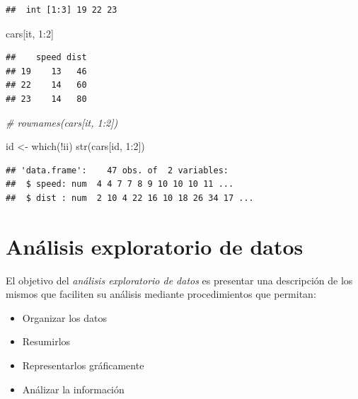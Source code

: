 \documentclass[
]{book}
\newenvironment{Shaded}{\begin{snugshade}}{\end{snugshade}}
\newcommand{\CommentTok}[1]{\textcolor[rgb]{0.56,0.35,0.01}{\textit{#1}}}
\newcommand{\DecValTok}[1]{\textcolor[rgb]{0.00,0.00,0.81}{#1}}
\newcommand{\FunctionTok}[1]{\textcolor[rgb]{0.00,0.00,0.00}{#1}}
\newcommand{\NormalTok}[1]{#1}
\newcommand{\OtherTok}[1]{\textcolor[rgb]{0.56,0.35,0.01}{#1}}
\newcommand{\SpecialCharTok}[1]{\textcolor[rgb]{0.00,0.00,0.00}{#1}}
\providecommand{\tightlist}{%
  \setlength{\itemsep}{0pt}\setlength{\parskip}{0pt}}
\theoremstyle{break}
\theoremstyle{nonumberplain}
\begin{document}
\begin{verbatim}
##  int [1:3] 19 22 23
\end{verbatim}

\begin{Shaded}
\begin{Highlighting}[]
\NormalTok{cars[it, }\DecValTok{1}\SpecialCharTok{:}\DecValTok{2}\NormalTok{]}
\end{Highlighting}
\end{Shaded}

\begin{verbatim}
##    speed dist
## 19    13   46
## 22    14   60
## 23    14   80
\end{verbatim}

\begin{Shaded}
\begin{Highlighting}[]
\CommentTok{\# rownames(cars[it, 1:2])}

\NormalTok{id }\OtherTok{\textless{}{-}} \FunctionTok{which}\NormalTok{(}\SpecialCharTok{!}\NormalTok{ii)}
\FunctionTok{str}\NormalTok{(cars[id, }\DecValTok{1}\SpecialCharTok{:}\DecValTok{2}\NormalTok{])}
\end{Highlighting}
\end{Shaded}

\begin{verbatim}
## 'data.frame':    47 obs. of  2 variables:
##  $ speed: num  4 4 7 7 8 9 10 10 10 11 ...
##  $ dist : num  2 10 4 22 16 10 18 26 34 17 ...
\end{verbatim}

\begin{Shaded}
\end{Shaded}

\hypertarget{anuxe1lisis-exploratorio-de-datos}{%
\chapter{Análisis exploratorio de datos}\label{anuxe1lisis-exploratorio-de-datos}}

El objetivo del \emph{análisis exploratorio de datos} es presentar una descripción de los
mismos que faciliten su análisis mediante procedimientos que permitan:

\begin{itemize}
\tightlist
\item
  Organizar los datos
\item
  Resumirlos
\item
  Representarlos gráficamente
\item
  Análizar la información
\end{itemize}
\end{document}
